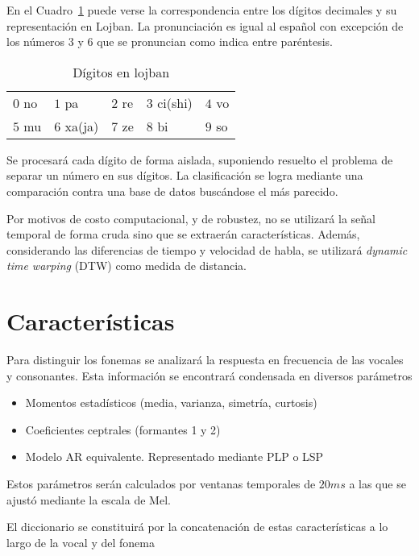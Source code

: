 \documentclass[a4paper]{article}
\begin{document}
		En el Cuadro~\ref{tab:digitos} puede verse la correspondencia entre los dígitos decimales
		y su representación en Lojban. La pronunciación es igual al español
		con excepción de los números $3$ y $6$ que se pronuncian como indica
		entre paréntesis.

		\begin{table}[h]
			\center
			\begin{tabular}{lllll}
				$0$ no & $1$ pa & $2$ re & $3$ ci(shi) & $4$ vo\\
				$5$ mu & $6$ xa(ja) & $7$ ze & $8$ bi & $9$ so\\
			\end{tabular}
			\caption{Dígitos en lojban}
			\label{tab:digitos}
		\end{table}

		Se procesará cada dígito de forma aislada, suponiendo
		resuelto el problema de separar un número en sus dígitos.
		La clasificación se logra mediante una comparación contra una
		base de datos buscándose el más parecido.

		Por motivos de costo computacional, y de robustez, no se
		utilizará la señal temporal de forma cruda sino que se
		extraerán características.  Además, considerando las
		diferencias de tiempo y velocidad de habla, se utilizará
		\emph{dynamic time warping} (DTW) como medida de distancia.

	\section{Características}
		Para distinguir los fonemas se analizará la
		respuesta en frecuencia de las vocales y consonantes.
		Esta información se encontrará condensada en diversos
		parámetros %
			\begin{itemize} \itemsep0pt
				\item Momentos estadísticos (media, varianza, simetría, curtosis)
				\item Coeficientes ceptrales (formantes 1 y 2)
				\item Modelo AR equivalente. Representado mediante PLP o LSP
			\end{itemize}

		Estos parámetros serán calculados por ventanas
		temporales de $20ms$ a las que se ajustó mediante la
		escala de Mel.

		El diccionario se constituirá por la concatenación de
		estas características a lo largo de la vocal y del fonema
\end{document}
